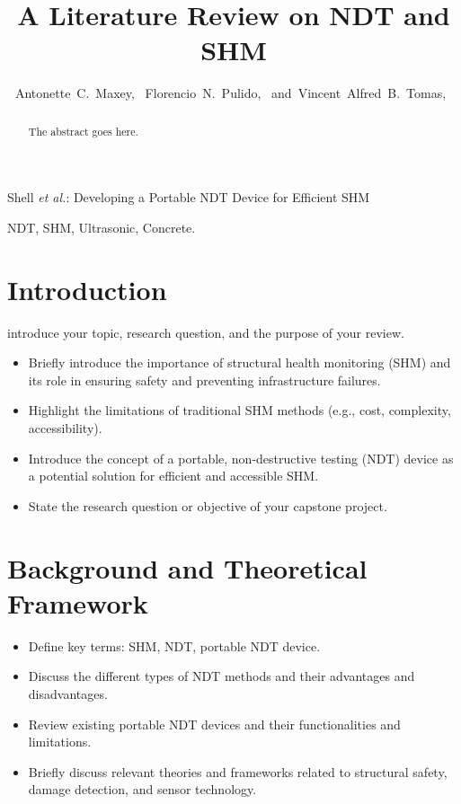 \documentclass[journal, a4paper]{IEEEtran}
\begin{document}
\title{A Literature Review on NDT and SHM}


\author{Antonette~C.~Maxey,~
        Florencio~N.~Pulido,~
        and~Vincent~Alfred~B.~Tomas,~%
}


%
{Shell \MakeLowercase{\textit{et al.}}: Developing a Portable NDT Device for Efficient SHM}


\maketitle


\begin{abstract}
The abstract goes here.
\end{abstract}


\begin{IEEEkeywords}
  NDT, SHM, Ultrasonic, Concrete.
\end{IEEEkeywords}







\section{Introduction}

 introduce your topic, research question, and the purpose of your review.
\begin{itemize}
  \item Briefly introduce the importance of structural health monitoring (SHM) and its role in ensuring safety and preventing infrastructure failures.
  \item Highlight the limitations of traditional SHM methods (e.g., cost, complexity, accessibility).
  \item Introduce the concept of a portable, non-destructive testing (NDT) device as a potential solution for efficient and accessible SHM.
  \item State the research question or objective of your capstone project.
\end{itemize}


\section{Background and Theoretical Framework}
\begin{itemize}
  \item Define key terms: SHM, NDT, portable NDT device.
  \item Discuss the different types of NDT methods and their advantages and disadvantages.
  \item Review existing portable NDT devices and their functionalities and limitations.
  \item Briefly discuss relevant theories and frameworks related to structural safety, damage detection, and sensor technology.
\end{itemize}
\end{document}
